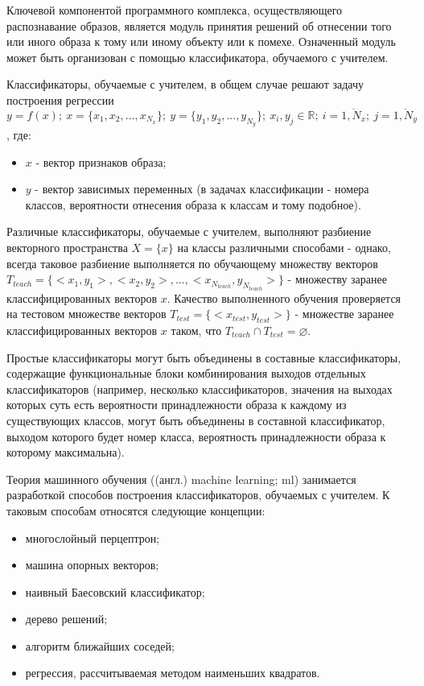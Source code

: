 
Ключевой компонентой программного комплекса, осуществляющего распознавание образов, является модуль принятия решений об отнесении того или иного образа к тому или иному объекту или к помехе. Означенный модуль может быть организован с помощью классификатора, обучаемого с учителем.

Классификаторы, обучаемые с учителем, в общем случае решают задачу построения регрессии $y = f(x) ;~ x = \{ x_1, x_2, ..., x_{N_x} \} ;~ y = \{ y_1, y_2, ..., y_{N_y} \} ;~ x_i, y_j \in \mathbb{R} ;~ i = \overline{1, N_x} ;~ j = \overline{1, N_y}$, где:

\begin{itemize}

	\item $x$ - вектор признаков образа;
	\item $y$ - вектор зависимых переменных (в задачах классификации - номера классов, вероятности отнесения образа к классам и тому подобное).

\end{itemize}

Различные классификаторы, обучаемые с учителем, выполняют разбиение векторного пространства $X = \{ x \}$ на классы различными способами - однако, всегда таковое разбиение выполняется по обучающему множеству векторов $T_{teach} = \{ <x_1, y_1>, <x_2, y_2>, ...,  <x_{N_{teach}}, y_{N_{teach}}>  \}$ - множеству заранее классифицированных векторов $x$. Качество выполненного обучения проверяется на тестовом множестве векторов $T_{test} = \{ <x_{test}, y_{test}> \}$ - множестве заранее классифицированных векторов $x$ таком, что $T_{teach} \cap T_{test} = \varnothing$.

Простые классификаторы могут быть объединены в составные классификаторы, содержащие функциональные блоки комбинирования выходов отдельных классификаторов (например, несколько классификаторов, значения на выходах которых суть есть вероятности принадлежности образа к каждому из существующих классов, могут быть объединены в составной классификатор, выходом которого будет номер класса, вероятность принадлежности образа к которому максимальна).

Теория машинного обучения ((англ.) machine learning; ml) занимается разработкой способов построения классификаторов, обучаемых с учителем. К таковым способам относятся следующие концепции:

\begin{itemize}

	\item многослойный перцептрон;
	\item машина опорных векторов;
	\item наивный Баесовский классификатор;
	\item дерево решений;
	\item алгоритм ближайших соседей;
	\item регрессия, рассчитываемая методом наименьших квадратов.

\end{itemize}


